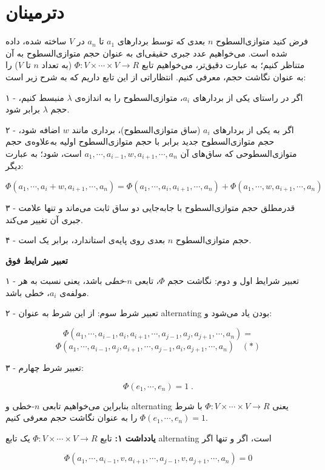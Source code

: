 \chapter{دترمینان}
	
	فرض کنید متوازی‌السطوح $n$ بعدی که توسط بردارهای $a_1$ تا $a_n$ در $V$ ساخته شده، داده شده است. می‌خواهیم عدد جبری حقیقی‌ای به عنوان حجم متوازی‌السطوح به آن متناظر کنیم؛ به عبارت دقیق‌تر، می‌خواهیم تابع
	$\Phi : V \times \cdots \times V \to R $
	(به تعداد $n$ تا $V$) را به عنوان نگاشت حجم، معرفی کنیم. انتظاراتی از این تابع داریم که به شرح زیر است:
	
	۱ - اگر در راستای یکی از بردارهای $a_i$، متوازی‌السطوح را به اندازه‌ی $\lambda$ منبسط کنیم، حجم $\lambda$ برابر شود.
	
	۲ - اگر به یکی از بردارهای $a_i$ (ساق متوازی‌السطوح)، برداری مانند $w$ اضافه شود، حجم متوازی‌السطوح جدید برابر با حجم متوازی‌السطوح اولیه به‌علاوه‌ی حجم متوازی‌السطوحی که ساق‌های آن $a_1,\cdots,a_{i-1},w,a_{i+1},\cdots,a_n$ است، شود؛ به عبارت دیگر:
	
	$$\Phi (a_1,\cdots,a_i+ w ,a_{i+1},\cdots,a_n) = \Phi (a_1,\cdots,a_i ,a_{i+1},\cdots,a_n) + \Phi (a_1,\cdots, w ,a_{i+1},\cdots,a_n)$$
	
	۳ - قدرمطلق حجم متوازی‌السطوح با جابه‌جایی دو ساق ثابت می‌ماند و تنها علامت جبری آن تغییر می‌کند.
	
	۴ - حجم متوازی‌السطوح $n$ بعدی روی پایه‌ی استاندارد، برابر یک است.
	
	\textbf{تعبیر شرایط فوق}
	
	۱ - تعبیر شرایط اول و دوم: نگاشت حجم $\Phi$، تابعی ‌$n$-\textit{خطی} باشد، یعنی نسبت به هر مولفه‌ی $a_i$، خطی باشد.
	
	۲ - تعبیر شرط سوم: از این شرط به عنوان alternating بودن یاد می‌شود و:
	
	$$\Phi (a_1,\cdots,a_{i-1},a_i,a_{i+1},\cdots,a_{j-1},a_j,a_{j+1},\cdots,a_n)
	= $$ $$
	\Phi (a_1,\cdots,a_{i-1},a_j,a_{i+1},\cdots,a_{j-1},a_i,a_{j+1},\cdots,a_n)  \; \; \; (*)$$
	
	۳ - تعبیر شرط چهارم:
	
	$$ \Phi(e_1 , \cdots , e_n) = 1 \; .$$
	
	بنابراین می‌خواهیم تابعی $n$-خطی و alternating یعنی $\Phi : V \times \cdots \times V \to R $ با شرط  
	$ \Phi(e_1 , \cdots , e_n) = 1 $
	را به عنوان نگاشت حجم معرفی کنیم.
	
	\textbf{یادداشت ۱:}
	تابع
		$\Phi : V \times \cdots \times V \to R $
		یک تابع alternating است، اگر و تنها اگر
		
		$$ \Phi(a_1, \cdots, a_{i-1}, v, a_{i+1}, \cdots, a_{j-1}, v, a_{j+1},\cdots,a_n) = 0 $$
		

